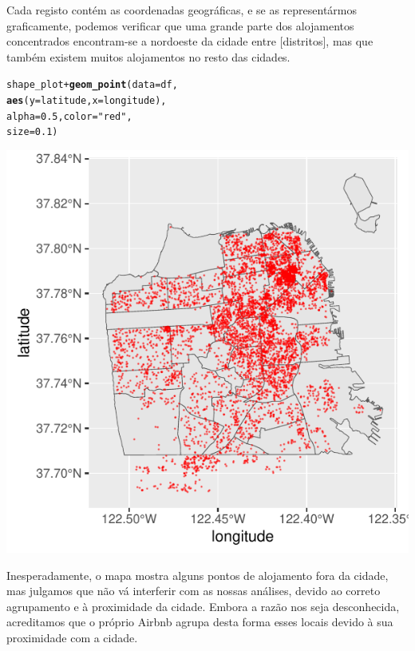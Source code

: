 \documentclass[a4paper, justified]{tufte-handout}\usepackage[]{graphicx}\usepackage[]{xcolor}
\makeatletter
\def\maxwidth{ %
  \ifdim\Gin@nat@width>\linewidth
    \linewidth
  \else
    \Gin@nat@width
  \fi
}
\newcommand{\hlnum}[1]{\textcolor[rgb]{0.686,0.059,0.569}{#1}}%
\newcommand{\hlstr}[1]{\textcolor[rgb]{0.192,0.494,0.8}{#1}}%
\newcommand{\hlopt}[1]{\textcolor[rgb]{0,0,0}{#1}}%
\newcommand{\hlstd}[1]{\textcolor[rgb]{0.345,0.345,0.345}{#1}}%
\newcommand{\hlkwc}[1]{\textcolor[rgb]{0.333,0.667,0.333}{#1}}%
\newcommand{\hlkwd}[1]{\textcolor[rgb]{0.737,0.353,0.396}{\textbf{#1}}}%
\newenvironment{kframe}{%
 \def\at@end@of@kframe{}%
 \ifinner\ifhmode%
  \def\at@end@of@kframe{\end{minipage}}%
  \begin{minipage}{\columnwidth}%
 \fi\fi%
 \def\FrameCommand##1{\hskip\@totalleftmargin \hskip-\fboxsep
 \colorbox{shadecolor}{##1}\hskip-\fboxsep
     \hskip-\linewidth \hskip-\@totalleftmargin \hskip\columnwidth}%
 \MakeFramed {\advance\hsize-\width
   \@totalleftmargin\z@ \linewidth\hsize
   \@setminipage}}%
 {\par\unskip\endMakeFramed%
 \at@end@of@kframe}
\newenvironment{knitrout}{}{} %
\makeatother
\begin{document}
Cada registo contém as coordenadas geográficas, e se as representármos graficamente, podemos verificar que uma grande parte dos alojamentos concentrados encontram-se a nordoeste da cidade entre [distritos], mas que também existem muitos alojamentos no resto das cidades.  %
\begin{knitrout}
\color{fgcolor}\begin{kframe}
\begin{alltt}
\hlstd{shape_plot} \hlopt{+} \hlkwd{geom_point}\hlstd{(}\hlkwc{data} \hlstd{= df,}
    \hlkwd{aes}\hlstd{(}\hlkwc{y} \hlstd{= latitude,} \hlkwc{x} \hlstd{= longitude),}
    \hlkwc{alpha} \hlstd{=} \hlnum{0.5}\hlstd{,} \hlkwc{color} \hlstd{=} \hlstr{"red"}\hlstd{,}
    \hlkwc{size} \hlstd{=} \hlnum{0.1}\hlstd{)}
\end{alltt}
\end{kframe}\begin{marginfigure}
\includegraphics[width=\maxwidth]{figure/chunk-plotPlace-1} \end{marginfigure}

\end{knitrout}
Inesperadamente, o mapa mostra alguns pontos de alojamento fora da cidade, mas julgamos que não vá interferir com as nossas análises, devido ao correto agrupamento e à proximidade da cidade. Embora a razão nos seja desconhecida, acreditamos que o próprio Airbnb agrupa desta forma esses locais devido à sua proximidade com a cidade. \\
\end{document}
